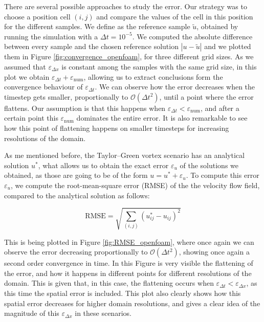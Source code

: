 \documentclass[
  english,        %
  font=times,     %
  onecolumn,      %
]{tumarticle}
\begin{document}
There are several possible approaches to study the error. Our strategy was to choose a position cell $(i,j)$ and compare the values of the cell in this position for the different samples. We define as the reference sample $\tilde{u}$, obtained by running the simulation with a $\Delta t = 10^{-5}$. 
We computed the absolute difference between every sample and the chosen reference solution $|u - \tilde{u}|$ and we plotted them in Figure \ref{fig:convergence_openfoam}, for three different grid sizes. As we assumed that $\varepsilon_{\Delta x}$ is constant among the samples with the same grid size, in this plot we obtain $\varepsilon_{\Delta t} + \varepsilon_\text{num}$, allowing us to extract conclusions form the convergence behaviour of $\varepsilon_{\Delta t}$. We can observe how the error decreases when the timestep gets smaller, proportionally to $\mathcal{O}(\Delta t^2)$, until a point where the error flattens. Our assumption is that this happens when $\varepsilon_{\Delta t} < \varepsilon_\text{num}$, and after a certain point this $\varepsilon_\text{num}$ dominates the entire error. It is also remarkable to see how this point of flattening happens on smaller timesteps for increasing resolutions of the domain.

As me mentioned before, the Taylor–Green vortex scenario has an analytical solution $u^*$, what allows us to obtain the exact error $\varepsilon_{u}$ of the solutions we obtained, as those are going to be of the form $u = u^* + \varepsilon_{u}$. To compute this error $\varepsilon_{u}$, we compute the root-mean-square error (RMSE) of the the velocity flow field, compared to the analytical solution as follows:  

\begin{equation}
    \text{RMSE} = \sqrt{\sum_{(i,j)} (u^*_{ij} - u_{ij})^2 }
\end{equation}

This is being plotted in Figure \ref{fig:RMSE_openfoam}, where once again we can observe the error decreasing proportionally to $\mathcal{O}(\Delta t^2)$, showing once again a second order convergence in time. In this Figure is very visible the flattening of the error, and how it happens in different points for different resolutions of the domain. This is given that, in this case, the flattening occurs when $\varepsilon_{\Delta t} < \varepsilon_{\Delta x}$, as this time the spatial error is included. This plot also clearly shows how this spatial error decreases for higher domain resolutions, and gives a clear idea of the magnitude of this $\varepsilon_{\Delta x}$ in these scenarios. 
\end{document}
